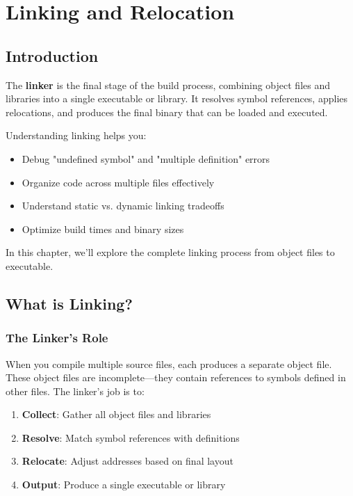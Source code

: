 \chapter{Linking and Relocation}

\section{Introduction}

The \textbf{linker} is the final stage of the build process, combining object files and libraries into a single executable or library. It resolves symbol references, applies relocations, and produces the final binary that can be loaded and executed.

Understanding linking helps you:
\begin{itemize}
    \item Debug "undefined symbol" and "multiple definition" errors
    \item Organize code across multiple files effectively
    \item Understand static vs. dynamic linking tradeoffs
    \item Optimize build times and binary sizes
\end{itemize}

In this chapter, we'll explore the complete linking process from object files to executable.

\section{What is Linking?}

\subsection{The Linker's Role}

When you compile multiple source files, each produces a separate object file. These object files are incomplete—they contain references to symbols defined in other files. The linker's job is to:

\begin{enumerate}
    \item \textbf{Collect}: Gather all object files and libraries
    \item \textbf{Resolve}: Match symbol references with definitions
    \item \textbf{Relocate}: Adjust addresses based on final layout
    \item \textbf{Output}: Produce a single executable or library
\end{enumerate}

